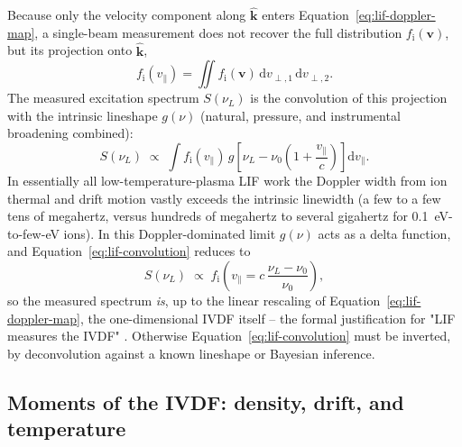 Because only the velocity component along $\hat{\mathbf{k}}$ enters Equation~\eqref{eq:lif-doppler-map}, a single-beam measurement does not recover the full distribution $f_{\mathrm{i}}(\mathbf{v})$, but its projection onto $\hat{\mathbf{k}}$,
\begin{equation}
f_{\mathrm{i}}(v_{\parallel}) = \iint f_{\mathrm{i}}(\mathbf{v})\, \mathrm{d}v_{\perp,1}\, \mathrm{d}v_{\perp,2}.
\label{eq:lif-projection}
\end{equation}
The measured excitation spectrum $S(\nu_{L})$ is the convolution of this projection with the intrinsic lineshape $g(\nu)$ (natural, pressure, and instrumental broadening combined):
\begin{equation}
S(\nu_{L}) \;\propto\; \int f_{\mathrm{i}}(v_{\parallel})\, g\!\left[\nu_{L} - \nu_{0}\left(1+\frac{v_{\parallel}}{c}\right)\right] \mathrm{d}v_{\parallel}.
\label{eq:lif-convolution}
\end{equation}
In essentially all low-temperature-plasma LIF work the Doppler width from ion thermal and drift motion vastly exceeds the intrinsic linewidth (a few to a few tens of megahertz, versus hundreds of megahertz to several gigahertz for \SI{0.1}{\electronvolt}-to-few-\si{\electronvolt} ions). In this Doppler-dominated limit $g(\nu)$ acts as a delta function, and Equation~\eqref{eq:lif-convolution} reduces to
\begin{equation}
S(\nu_{L}) \;\propto\; f_{\mathrm{i}}\!\left(v_{\parallel} = c\,\frac{\nu_{L}-\nu_{0}}{\nu_{0}}\right),
\label{eq:lif-doppler-limit}
\end{equation}
so the measured spectrum \emph{is}, up to the linear rescaling of Equation~\eqref{eq:lif-doppler-map}, the one-dimensional IVDF itself -- the formal justification for "LIF measures the IVDF" \cite{ref0347}. Otherwise Equation~\eqref{eq:lif-convolution} must be inverted, by deconvolution against a known lineshape or Bayesian inference.

\subsection{Moments of the IVDF: density, drift, and temperature}

